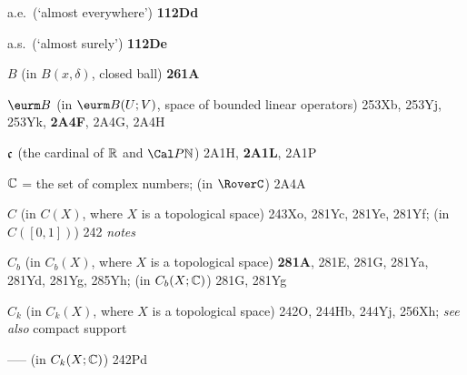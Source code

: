 a.e.\ (`almost everywhere') {\bf 112Dd}

a.s.\ (`almost surely') {\bf 112De}



\indexmedskip
{}



$B$ (in $B(x,\delta)$, closed ball) {\bf 261A}


$\eurm B$ (in $\eurm B(U;V)$, space of bounded linear operators)
253Xb, 253Yj, 253Yk, {\bf 2A4F}, 2A4G, 2A4H 

















\indexmedskip
{}







$\frak c$ (the cardinal of $\Bbb R$ and $\Cal P\Bbb N$) 2A1H,
{\bf 2A1L}, 2A1P




$\Bbb C$ = the set of complex numbers; (in $\RoverC$) 2A4A

$C$ (in $C(X)$, where $X$ is a topological space) 243Xo, 281Yc,
281Ye, 281Yf;  
  (in $C([0,1])$) 242 {\it notes}




$C_b$ (in $C_b(X)$, where $X$ is a topological space) {\bf 281A},
281E, 281G, 281Ya, 281Yd, 281Yg, 285Yh;  
  (in $C_b(X;\Bbb C)$) 281G, 281Yg




$C_k$ (in $C_k(X)$, where $X$ is a topological space)
242O, 244Hb, 244Yj, 256Xh;  
  {\it see also} compact support


----- (in $C_k(X;\Bbb C)$) 242Pd

































